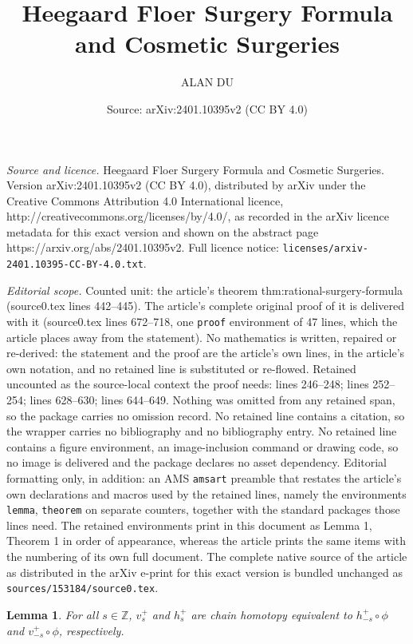 \documentclass[10pt,a4paper]{amsart}
\title{Heegaard Floer Surgery Formula and Cosmetic Surgeries}
\author{ALAN DU}
\date{Source: arXiv:2401.10395v2 (CC BY 4.0)}
\newtheorem{lemma}{Lemma}
\newcommand{\Z}{{\mathbb{Z}}}
\begin{document}
\maketitle

\noindent\emph{Source and licence.} Heegaard Floer Surgery Formula and Cosmetic Surgeries. Version arXiv:2401.10395v2 (CC BY 4.0), distributed by arXiv under the Creative Commons Attribution 4.0 International licence, http://creativecommons.org/licenses/by/4.0/, as recorded in the arXiv licence metadata for this exact version and shown on the abstract page https://arxiv.org/abs/2401.10395v2. Full licence notice: \texttt{licenses/arxiv-2401.10395-CC-BY-4.0.txt}.\par\smallskip

\noindent\textit{Editorial scope.} Counted unit: the article's theorem thm:rational-surgery-formula (source0.tex lines 442--445). The article's complete original proof of it is delivered with it (source0.tex lines 672--718, one \texttt{proof} environment of 47 lines, which the article places away from the statement). No mathematics is written, repaired or re-derived: the statement and the proof are the article's own lines, in the article's own notation, and no retained line is substituted or re-flowed.  Retained uncounted as the source-local context the proof needs: lines 246--248; lines 252--254; lines 628--630; lines 644--649.  Nothing was omitted from any retained span, so the package carries no omission record.  No retained line contains a citation, so the wrapper carries no bibliography and no bibliography entry.  No retained line contains a figure environment, an image-inclusion command or drawing code, so no image is delivered and the package declares no asset dependency.  Editorial formatting only, in addition: an AMS \texttt{amsart} preamble that restates the article's own declarations and macros used by the retained lines, namely the environments \texttt{lemma}, \texttt{theorem} on separate counters, together with the standard packages those lines need.  The retained environments print in this document as Lemma 1, Theorem 1 in order of appearance, whereas the article prints the same items with the numbering of its own full document.  The complete native source of the article as distributed in the arXiv e-print for this exact version is bundled unchanged as \texttt{sources/153184/source0.tex}.
\begin{lemma}\label{lem:v-h-equiv}
For all $s\in\Z$, $v_s^+$ and $h_s^+$ are chain homotopy equivalent to $h_{-s}^+\circ\phi$ and $v_{-s}^+\circ\phi$, respectively.
\end{lemma}
\end{document}

